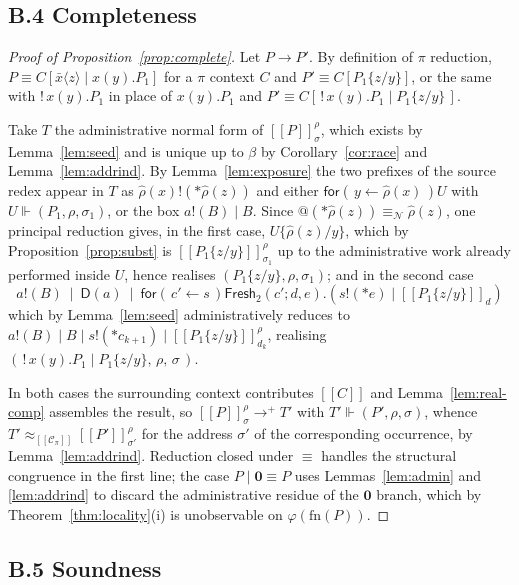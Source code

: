 \documentclass[11pt]{article}
\makeatletter
\theoremstyle{definition}
\theoremstyle{plain}
\theoremstyle{remark}
\newcommand{\quo}[1]{@#1}
\newcommand{\drp}[1]{{*}#1}
\newcommand{\inp}[3]{\mathsf{for}(\,#1 \leftarrow #2\,)#3}
\newcommand{\out}[2]{#1!(#2)}
\newcommand{\enc}[1]{[\![#1]\!]}
\newcommand{\nequiv}{\equiv_{\mathcal{N}}}
\newcommand{\nil}{\mathbf{0}}
\newcommand{\Frsh}{\mathsf{Fresh}_2}
\newcommand{\Dup}{\mathsf{D}}
\newcommand{\Ctx}{\mathscr{C}}
\newcommand{\bisim}{\approx}
\newcommand{\real}{\Vdash}
\newcommand{\fn}{\mathrm{fn}}
\makeatother
\begin{document}
\subsection{B.4 Completeness}

\begin{proof}[Proof of Proposition~\ref{prop:complete}]
Let $P \to P'$. By definition of $\pi$ reduction, $P \equiv
C[\bar x\langle z\rangle \mid x(y).P_1]$ for a $\pi$ context $C$ and $P'
\equiv C[P_1\{z/y\}]$, or the same with $!\,x(y).P_1$ in place of
$x(y).P_1$ and $P' \equiv C[\,!\,x(y).P_1 \mid P_1\{z/y\}\,]$.

Take $T$ the administrative normal form of $\enc{P}^\rho_\sigma$, which
exists by Lemma~\ref{lem:seed} and is unique up to $\beta$ by
Corollary~\ref{cor:race} and Lemma~\ref{lem:addrind}. By
Lemma~\ref{lem:exposure} the two prefixes of the source redex appear in
$T$ as $\out{\hat\rho(x)}{\drp{\hat\rho(z)}}$ and either
$\inp{y}{\hat\rho(x)}{U}$ with $U \real (P_1,\rho,\sigma_1)$, or the box
$\out{a}{B} \mid B$. Since $\quo{(\drp{\hat\rho(z)})} \nequiv
\hat\rho(z)$, one principal reduction gives, in the first case,
$U\{\hat\rho(z)/y\}$, which by Proposition~\ref{prop:subst} is
$\enc{P_1\{z/y\}}^\rho_{\sigma_1}$ up to the administrative work already
performed inside $U$, hence realises $(P_1\{z/y\},\rho,\sigma_1)$; and in
the second case
\[
  \out{a}{B} \ \mid\ \Dup(a) \ \mid\
  \inp{c'}{s}{\Frsh(c';d,e).(\out{s}{\drp{e}} \mid \enc{P_1\{z/y\}}_d)}
\]
which by Lemma~\ref{lem:seed} administratively reduces to
$\out{a}{B} \mid B \mid \out{s}{\drp{c_{k+1}}} \mid
\enc{P_1\{z/y\}}^\rho_{d_k}$, realising
$(\,!\,x(y).P_1 \mid P_1\{z/y\},\,\rho,\,\sigma\,)$.

In both cases the surrounding context contributes
$\enc{C}$ and Lemma~\ref{lem:real-comp} assembles the result, so
$\enc{P}^\rho_\sigma \to^{+} T'$ with $T' \real (P',\rho,\sigma)$, whence
$T' \bisim_{\enc{\Ctx_\pi}} \enc{P'}^\rho_{\sigma'}$ for the address
$\sigma'$ of the corresponding occurrence, by
Lemma~\ref{lem:addrind}. Reduction closed under $\equiv$ handles the
structural congruence in the first line; the case $P \mid \nil \equiv P$
uses Lemmas~\ref{lem:admin} and \ref{lem:addrind} to discard the
administrative residue of the $\nil$ branch, which by
Theorem~\ref{thm:locality}(i) is unobservable on $\varphi(\fn(P))$.
\end{proof}

\subsection{B.5 Soundness}
\end{document}
